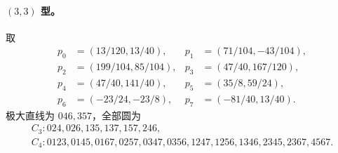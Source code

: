 \documentclass[11pt,a4paper]{ctexart}
\theoremstyle{definition}
\begin{document}
\paragraph{$(3,3)$ 型。}
取
\[
\begin{aligned}
p_0&=(13/120,13/40),&p_1&=(71/104,-43/104),\\
p_2&=(199/104,85/104),&p_3&=(47/40,167/120),\\
p_4&=(47/40,141/40),&p_5&=(35/8,59/24),\\
p_6&=(-23/24,-23/8),&p_7&=(-81/40,13/40).
\end{aligned}
\]
极大直线为 $046,357$，全部圆为
\[
\begin{gathered}
C_3: 024,026,135,137,157,246,\\
C_4: 0123,0145,0167,0257,0347,0356,1247,1256,1346,2345,2367,4567.
\end{gathered}
\]
\end{document}
